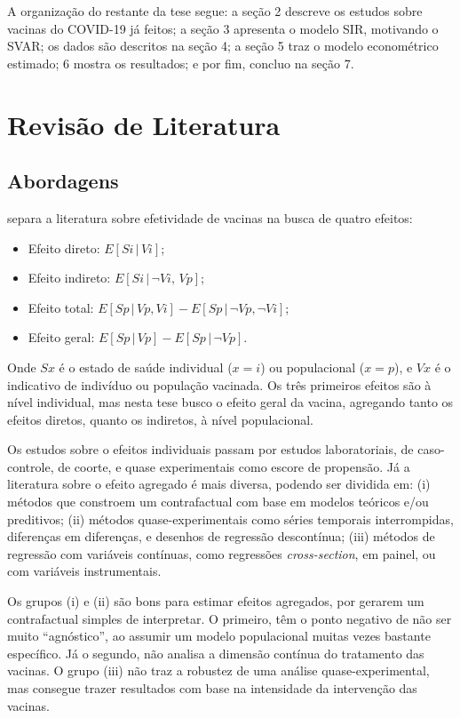 \documentclass[
    article,
	12pt,				%
	oneside,			%
	a4paper,			%
	english,			%
	brazil,				%
	hyperref = {colorlinks, citecolor=c1d, linkcolor=c2d, urlcolor=c3d, colorlinks}
	]{abntex2}
\newcounter{j}
\begin{document}
A organização do restante da tese segue: a seção 2 descreve os estudos sobre vacinas do COVID-19 já feitos; a seção 3 apresenta o modelo SIR, motivando o SVAR; os dados são descritos na seção 4; a seção 5 traz o modelo econométrico estimado; 6 mostra os resultados; e por fim, concluo na seção 7.



\let\clearpage\relax
\chapter{Revisão de Literatura}

\section{Abordagens}

\cite{Halloran1999} separa a literatura sobre efetividade de vacinas na busca de quatro efeitos:

\begin{itemize}
    \item Efeito direto: $E[Si \,|\, Vi]$;
    \item Efeito indireto: $E[Si \,|\, \neg Vi,\, Vp]$;
    \item Efeito total: $E[Sp \,|\, Vp, Vi] - E[Sp \,|\, \neg Vp, \neg Vi]$;
    \item Efeito geral: $E[Sp \,|\, Vp] - E[Sp \,|\, \neg Vp]$.
\end{itemize}

Onde $Sx$ é o estado de saúde individual ($x=i$) ou populacional ($x=p$), e $Vx$ é o indicativo de indivíduo ou população vacinada. Os três primeiros efeitos são à nível individual, mas nesta tese busco o efeito geral da vacina, agregando tanto os efeitos diretos, quanto os indiretos, à nível populacional.

Os estudos sobre o efeitos individuais passam por estudos laboratoriais, de caso-controle, de coorte, e quase experimentais como escore de propensão. Já a literatura sobre o efeito agregado é mais diversa, podendo ser dividida em: (i) métodos que constroem um contrafactual com base em modelos teóricos e/ou preditivos; (ii) métodos quase-experimentais como séries temporais interrompidas, diferenças em diferenças, e desenhos de regressão descontínua; (iii) métodos de regressão com variáveis contínuas, como regressões \textit{cross-section}, em painel, ou com variáveis instrumentais.

Os grupos (i) e (ii) são bons para estimar efeitos agregados, por gerarem um contrafactual simples de interpretar. O primeiro, têm o ponto negativo de não ser muito ``agnóstico'', ao assumir um modelo populacional muitas vezes bastante específico. Já o segundo, não analisa a dimensão contínua do tratamento das vacinas. O grupo (iii) não traz a robustez de uma análise quase-experimental, mas consegue trazer resultados com base na intensidade da intervenção das vacinas.
\end{document}

